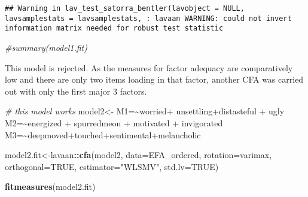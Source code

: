 \documentclass[
]{article}
\newenvironment{Shaded}{\begin{snugshade}}{\end{snugshade}}
\newcommand{\CommentTok}[1]{\textcolor[rgb]{0.56,0.35,0.01}{\textit{#1}}}
\newcommand{\DataTypeTok}[1]{\textcolor[rgb]{0.13,0.29,0.53}{#1}}
\newcommand{\KeywordTok}[1]{\textcolor[rgb]{0.13,0.29,0.53}{\textbf{#1}}}
\newcommand{\NormalTok}[1]{#1}
\newcommand{\OperatorTok}[1]{\textcolor[rgb]{0.81,0.36,0.00}{\textbf{#1}}}
\newcommand{\OtherTok}[1]{\textcolor[rgb]{0.56,0.35,0.01}{#1}}
\newcommand{\StringTok}[1]{\textcolor[rgb]{0.31,0.60,0.02}{#1}}
\begin{document}
\begin{verbatim}
## Warning in lav_test_satorra_bentler(lavobject = NULL, lavsamplestats = lavsamplestats, : lavaan WARNING: could not invert information matrix needed for robust test statistic
\end{verbatim}

\begin{Shaded}
\begin{Highlighting}[]
\CommentTok{\#summary(model1.fit)}
\end{Highlighting}
\end{Shaded}

This model is rejected. As the measures for factor adequacy are
comparatively low and there are only two items loading in that factor,
another CFA was carried out with only the first major 3 factors.

\begin{Shaded}
\begin{Highlighting}[]
  \CommentTok{\# this model works}
\NormalTok{  model2\textless{}{-}}\StringTok{\textquotesingle{}}
\StringTok{  M1=\textasciitilde{}worried+ unsettling+distasteful + ugly }
\StringTok{  M2=\textasciitilde{}energized + spurredmeon + motivated + invigorated}
\StringTok{  M3=\textasciitilde{}deepmoved+touched+sentimental+melancholic \textquotesingle{}}
   
\NormalTok{ model2.fit\textless{}{-}lavaan}\OperatorTok{::}\KeywordTok{cfa}\NormalTok{(model2,}
                         \DataTypeTok{data=}\NormalTok{EFA\_ordered,}
                         \DataTypeTok{rotation=}\StringTok{\textquotesingle{}varimax\textquotesingle{}}\NormalTok{,}
                         \DataTypeTok{orthogonal=}\OtherTok{TRUE}\NormalTok{, }
                         \DataTypeTok{estimator=}\StringTok{"WLSMV"}\NormalTok{, }
                         \DataTypeTok{std.lv=}\OtherTok{TRUE}\NormalTok{)}
  
\KeywordTok{fitmeasures}\NormalTok{(model2.fit)}
\end{Highlighting}
\end{Shaded}
\end{document}
